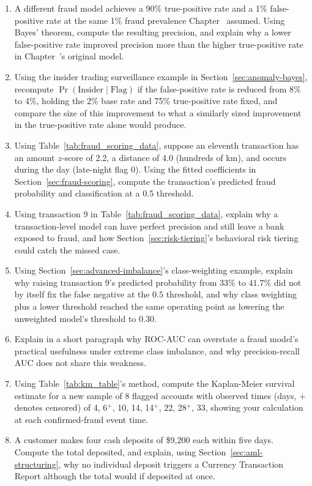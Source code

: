 \documentclass[../ai_in_finance]{subfiles}
\begin{document}
\begin{enumerate}[exercises]
    \item A different fraud model achieves a 90\% true-positive rate and a 1\% false-positive rate at the same 1\% fraud prevalence Chapter~ assumed. Using Bayes' theorem, compute the resulting precision, and explain why a lower false-positive rate improved precision more than the higher true-positive rate in Chapter~'s original model.
    \item Using the insider trading surveillance example in Section~\ref{sec:anomaly-bayes}, recompute $\Pr(\text{Insider}\mid\text{Flag})$ if the false-positive rate is reduced from 8\% to 4\%, holding the 2\% base rate and 75\% true-positive rate fixed, and compare the size of this improvement to what a similarly sized improvement in the true-positive rate alone would produce.
    \item Using Table~\ref{tab:fraud_scoring_data}, suppose an eleventh transaction has an amount $z$-score of 2.2, a distance of 4.0 (hundreds of km), and occurs during the day (late-night flag 0). Using the fitted coefficients in Section~\ref{sec:fraud-scoring}, compute the transaction's predicted fraud probability and classification at a 0.5 threshold.
    \item Using transaction 9 in Table~\ref{tab:fraud_scoring_data}, explain why a transaction-level model can have perfect precision and still leave a bank exposed to fraud, and how Section~\ref{sec:risk-tiering}'s behavioral risk tiering could catch the missed case.
    \item Using Section~\ref{sec:advanced-imbalance}'s class-weighting example, explain why raising transaction 9's predicted probability from $33\%$ to $41.7\%$ did not by itself fix the false negative at the $0.5$ threshold, and why class weighting plus a lower threshold reached the same operating point as lowering the unweighted model's threshold to $0.30$.
    \item Explain in a short paragraph why ROC-AUC can overstate a fraud model's practical usefulness under extreme class imbalance, and why precision-recall AUC does not share this weakness.
    \item Using Table~\ref{tab:km_table}'s method, compute the Kaplan-Meier survival estimate for a new sample of 8 flagged accounts with observed times (days, $+$ denotes censored) of 4, 6$^+$, 10, 14, 14$^+$, 22, 28$^+$, 33, showing your calculation at each confirmed-fraud event time.
    \item A customer makes four cash deposits of \$9,200 each within five days. Compute the total deposited, and explain, using Section~\ref{sec:aml-structuring}, why no individual deposit triggers a Currency Transaction Report although the total would if deposited at once.

\end{enumerate}
\end{document}
